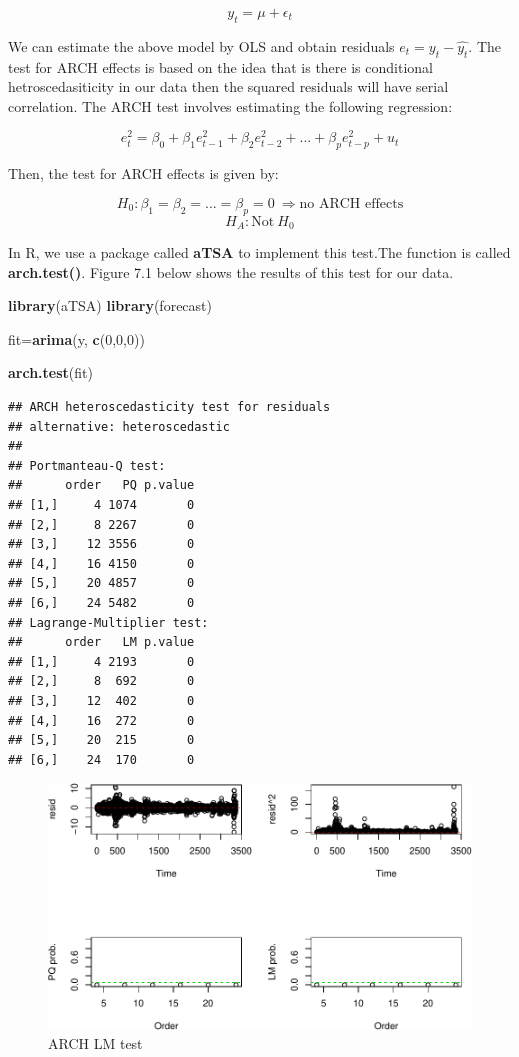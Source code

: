 \documentclass[]{book}
\newenvironment{Shaded}{\begin{snugshade}}{\end{snugshade}}
\newcommand{\KeywordTok}[1]{\textcolor[rgb]{0.13,0.29,0.53}{\textbf{#1}}}
\newcommand{\DecValTok}[1]{\textcolor[rgb]{0.00,0.00,0.81}{#1}}
\newcommand{\NormalTok}[1]{#1}
\theoremstyle{definition}
\theoremstyle{definition}
\theoremstyle{definition}
\theoremstyle{remark}
\begin{document}
\[y_t=\mu +\epsilon_t\]

We can estimate the above model by OLS and obtain residuals \(e_t=y_t-\hat{y_t}\). The test for ARCH effects is based on the idea that is there is conditional hetroscedasiticity in our data then the squared residuals will have serial correlation. The ARCH test involves estimating the following regression:

\[e^2_t= \beta_0 +\beta_1 e^2_{t-1} + \beta_2 e^2_{t-2}+...+ \beta_p e^2_{t-p} + u_t\]

Then, the test for ARCH effects is given by:

\[H_0: \beta_1=\beta_2=...=\beta_p=0 \ \Rightarrow \text{no ARCH effects}\]
\[ H_A: \text{Not} \ H_0\]

In R, we use a package called \textbf{aTSA} to implement this test.The function is called \textbf{arch.test()}. Figure 7.1 below shows the results of this test for our data.

\begin{Shaded}
\begin{Highlighting}[]
\KeywordTok{library}\NormalTok{(aTSA)}
\KeywordTok{library}\NormalTok{(forecast)}

\NormalTok{fit=}\KeywordTok{arima}\NormalTok{(y, }\KeywordTok{c}\NormalTok{(}\DecValTok{0}\NormalTok{,}\DecValTok{0}\NormalTok{,}\DecValTok{0}\NormalTok{))}

\KeywordTok{arch.test}\NormalTok{(fit)}
\end{Highlighting}
\end{Shaded}

\begin{verbatim}
## ARCH heteroscedasticity test for residuals 
## alternative: heteroscedastic 
## 
## Portmanteau-Q test: 
##      order   PQ p.value
## [1,]     4 1074       0
## [2,]     8 2267       0
## [3,]    12 3556       0
## [4,]    16 4150       0
## [5,]    20 4857       0
## [6,]    24 5482       0
## Lagrange-Multiplier test: 
##      order   LM p.value
## [1,]     4 2193       0
## [2,]     8  692       0
## [3,]    12  402       0
## [4,]    16  272       0
## [5,]    20  215       0
## [6,]    24  170       0
\end{verbatim}

\begin{figure}
\centering
\includegraphics{bookdown-demo_files/figure-latex/table1-1.pdf}
\caption{\label{fig:table1}ARCH LM test}
\end{figure}
\end{document}
